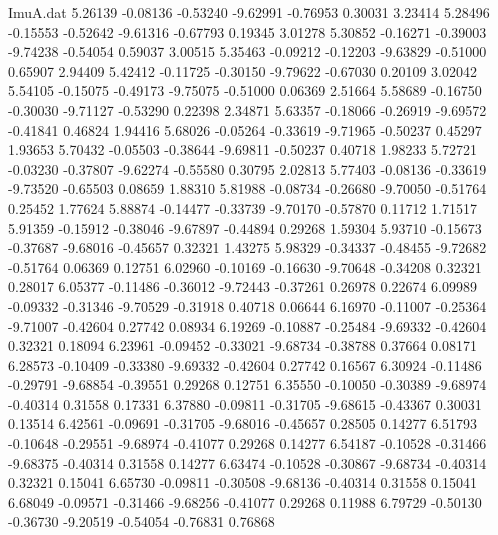 \begin{filecontents}{ImuA.dat}
   5.26139   -0.08136   -0.53240   -9.62991   -0.76953    0.30031    3.23414
   5.28496   -0.15553   -0.52642   -9.61316   -0.67793    0.19345    3.01278
   5.30852   -0.16271   -0.39003   -9.74238   -0.54054    0.59037    3.00515
   5.35463   -0.09212   -0.12203   -9.63829   -0.51000    0.65907    2.94409
   5.42412   -0.11725   -0.30150   -9.79622   -0.67030    0.20109    3.02042
   5.54105   -0.15075   -0.49173   -9.75075   -0.51000    0.06369    2.51664
   5.58689   -0.16750   -0.30030   -9.71127   -0.53290    0.22398    2.34871
   5.63357   -0.18066   -0.26919   -9.69572   -0.41841    0.46824    1.94416
   5.68026   -0.05264   -0.33619   -9.71965   -0.50237    0.45297    1.93653
   5.70432   -0.05503   -0.38644   -9.69811   -0.50237    0.40718    1.98233
   5.72721   -0.03230   -0.37807   -9.62274   -0.55580    0.30795    2.02813
   5.77403   -0.08136   -0.33619   -9.73520   -0.65503    0.08659    1.88310
   5.81988   -0.08734   -0.26680   -9.70050   -0.51764    0.25452    1.77624
   5.88874   -0.14477   -0.33739   -9.70170   -0.57870    0.11712    1.71517
   5.91359   -0.15912   -0.38046   -9.67897   -0.44894    0.29268    1.59304
   5.93710   -0.15673   -0.37687   -9.68016   -0.45657    0.32321    1.43275
   5.98329   -0.34337   -0.48455   -9.72682   -0.51764    0.06369    0.12751
   6.02960   -0.10169   -0.16630   -9.70648   -0.34208    0.32321    0.28017
   6.05377   -0.11486   -0.36012   -9.72443   -0.37261    0.26978    0.22674
   6.09989   -0.09332   -0.31346   -9.70529   -0.31918    0.40718    0.06644
   6.16970   -0.11007   -0.25364   -9.71007   -0.42604    0.27742    0.08934
   6.19269   -0.10887   -0.25484   -9.69332   -0.42604    0.32321    0.18094
   6.23961   -0.09452   -0.33021   -9.68734   -0.38788    0.37664    0.08171
   6.28573   -0.10409   -0.33380   -9.69332   -0.42604    0.27742    0.16567
   6.30924   -0.11486   -0.29791   -9.68854   -0.39551    0.29268    0.12751
   6.35550   -0.10050   -0.30389   -9.68974   -0.40314    0.31558    0.17331
   6.37880   -0.09811   -0.31705   -9.68615   -0.43367    0.30031    0.13514
   6.42561   -0.09691   -0.31705   -9.68016   -0.45657    0.28505    0.14277
   6.51793   -0.10648   -0.29551   -9.68974   -0.41077    0.29268    0.14277
   6.54187   -0.10528   -0.31466   -9.68375   -0.40314    0.31558    0.14277
   6.63474   -0.10528   -0.30867   -9.68734   -0.40314    0.32321    0.15041
   6.65730   -0.09811   -0.30508   -9.68136   -0.40314    0.31558    0.15041
   6.68049   -0.09571   -0.31466   -9.68256   -0.41077    0.29268    0.11988
   6.79729   -0.50130   -0.36730   -9.20519   -0.54054   -0.76831    0.76868

\end{filecontents}
